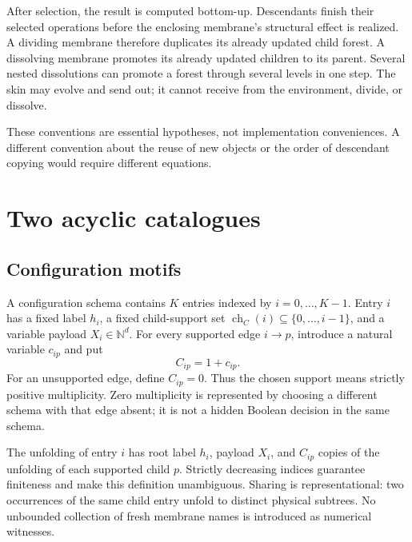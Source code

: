\documentclass[11pt,letterpaper]{article}
\theoremstyle{definition}
\theoremstyle{remark}
\newcommand{\N}{\mathbb N}
\newcommand{\ch}{\operatorname{ch}}
\begin{document}
After selection, the result is computed bottom-up. Descendants finish their selected operations before the enclosing membrane's structural effect is realized. A dividing membrane therefore duplicates its already updated child forest. A dissolving membrane promotes its already updated children to its parent. Several nested dissolutions can promote a forest through several levels in one step. The skin may evolve and send out; it cannot receive from the environment, divide, or dissolve.

These conventions are essential hypotheses, not implementation conveniences. A different convention about the reuse of new objects or the order of descendant copying would require different equations.

\section{Two acyclic catalogues}\label{qoc:mm:sec:schemas}
\subsection{Configuration motifs}
A configuration schema contains $K$ entries indexed by $i=0,\ldots,K-1$. Entry $i$ has a fixed label $h_i$, a fixed child-support set $\ch_C(i)\subseteq\{0,\ldots,i-1\}$, and a variable payload $X_i\in\N^d$. For every supported edge $i\to p$, introduce a natural variable $c_{ip}$ and put
\begin{equation}\label{qoc:mm:eq:C}
 C_{ip}=1+c_{ip}.
\end{equation}
For an unsupported edge, define $C_{ip}=0$. Thus the chosen support means strictly positive multiplicity. Zero multiplicity is represented by choosing a different schema with that edge absent; it is not a hidden Boolean decision in the same schema.

The unfolding of entry $i$ has root label $h_i$, payload $X_i$, and $C_{ip}$ copies of the unfolding of each supported child $p$. Strictly decreasing indices guarantee finiteness and make this definition unambiguous. Sharing is representational: two occurrences of the same child entry unfold to distinct physical subtrees. No unbounded collection of fresh membrane names is introduced as numerical witnesses.
\end{document}
